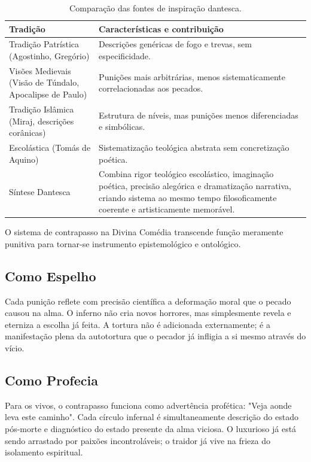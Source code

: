 \begin{table}[ht]
  \centering
  \small
  \renewcommand{\arraystretch}{1.3}
  \caption{Comparação das fontes de inspiração dantesca.}
  \label{tab:fontes-dantes}
  \begin{tabularx}{\textwidth}{|>{\raggedright\arraybackslash}p{4.5cm}|X|}
    \hline
    \textbf{Tradição} & \textbf{Características e contribuição} \\
    \hline
    Tradição Patrística (Agostinho, Gregório) & Descrições genéricas de fogo e trevas, sem especificidade. \\
    \hline
    Visões Medievais (Visão de Túndalo, Apocalipse de Paulo) & Punições mais arbitrárias, menos sistematicamente correlacionadas aos pecados. \\
    \hline
    Tradição Islâmica (Miraj, descrições corânicas) & Estrutura de níveis, mas punições menos diferenciadas e simbólicas. \\
    \hline
    Escolástica (Tomás de Aquino) & Sistematização teológica abstrata sem concretização poética. \\
    \hline
    Síntese Dantesca & Combina rigor teológico escolástico, imaginação poética, precisão alegórica e dramatização narrativa, criando sistema ao mesmo tempo filosoficamente coerente e artisticamente memorável. \\
    \hline
  \end{tabularx}
\end{table}

O sistema de contrapasso na Divina Comédia transcende função meramente punitiva para tornar-se instrumento epistemológico e ontológico.


\subsection{Como Espelho}

Cada punição reflete com precisão científica a deformação moral que o pecado causou na alma. O inferno não cria novos horrores, mas simplesmente revela e eterniza a escolha já feita. A tortura não é adicionada externamente; é a manifestação plena da autotortura que o pecador já infligia a si mesmo através do vício.


\subsection{Como Profecia}

Para os vivos, o contrapasso funciona como advertência profética: "Veja aonde leva este caminho". Cada círculo infernal é simultaneamente descrição do estado pós-morte e diagnóstico do estado presente da alma viciosa. O luxurioso já está sendo arrastado por paixões incontroláveis; o traidor já vive na frieza do isolamento espiritual.


